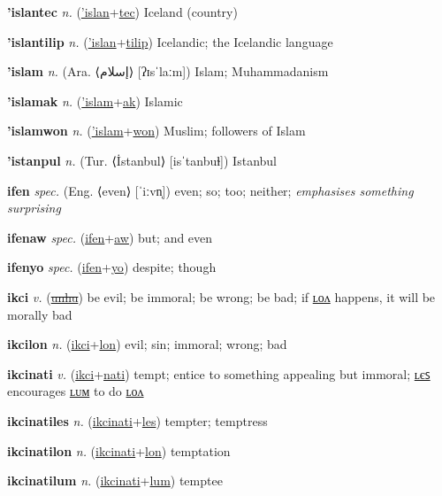 \textbf{\hypertarget{'islantec}{'islantec}} \textit{n.} (\hyperlink{'islan}{'islan}+\allowbreak \hyperlink{tec}{tec})
Iceland (country)

\textbf{\hypertarget{'islantilip}{'islantilip}} \textit{n.} (\hyperlink{'islan}{'islan}+\allowbreak \hyperlink{tilip}{tilip})
Icelandic; the Icelandic language

\textbf{\hypertarget{'islam}{'islam}} \textit{n.} (Ara. ⟨{\arabics{}إسلام}⟩ [ʔɪsˈlaːm])
Islam; Muhammadanism

\textbf{\hypertarget{'islamak}{'islamak}} \textit{n.} (\hyperlink{'islam}{'islam}+\allowbreak \hyperlink{ak}{ak})
Islamic

\textbf{\hypertarget{'islamwon}{'islamwon}} \textit{n.} (\hyperlink{'islam}{'islam}+\allowbreak \hyperlink{won}{won})
Muslim; followers of Islam

\textbf{\hypertarget{'istanpul}{'istanpul}} \textit{n.} (Tur. ⟨İstanbul⟩ [isˈtanbuɫ])
Istanbul

\textbf{\hypertarget{ifen}{ifen}} \textit{spec.} (Eng. ⟨even⟩ [ˈiːvn̩])
even; so; too; neither; \textit{emphasises something surprising}

\textbf{\hypertarget{ifenaw}{ifenaw}} \textit{spec.} (\hyperlink{ifen}{ifen}+\allowbreak \hyperlink{aw}{aw})
but; and even

\textbf{\hypertarget{ifenyo}{ifenyo}} \textit{spec.} (\hyperlink{ifen}{ifen}+\allowbreak \hyperlink{yo}{yo})
despite; though

\textbf{\hypertarget{ikci}{ikci}} \textit{v.} (\hyperlink{unhu}{\sout{unhu}})
be evil; be immoral; be wrong; be bad; if \hyperlink{ikcilon}{ʟᴏᴧ} happens, it will be morally bad

\textbf{\hypertarget{ikcilon}{ikcilon}} \textit{n.} (\hyperlink{ikci}{ikci}+\allowbreak \hyperlink{lon}{lon})
evil; sin; immoral; wrong; bad

\textbf{\hypertarget{ikcinati}{ikcinati}} \textit{v.} (\hyperlink{ikci}{ikci}+\allowbreak \hyperlink{nati}{nati})
tempt; entice to something appealing but immoral; \hyperlink{ikcinatiles}{ʟєꜱ} encourages \hyperlink{ikcinatilum}{ʟᴜᴍ} to do \hyperlink{ikcinatilon}{ʟᴏᴧ}

\textbf{\hypertarget{ikcinatiles}{ikcinatiles}} \textit{n.} (\hyperlink{ikcinati}{ikcinati}+\allowbreak \hyperlink{les}{les})
tempter; temptress

\textbf{\hypertarget{ikcinatilon}{ikcinatilon}} \textit{n.} (\hyperlink{ikcinati}{ikcinati}+\allowbreak \hyperlink{lon}{lon})
temptation

\textbf{\hypertarget{ikcinatilum}{ikcinatilum}} \textit{n.} (\hyperlink{ikcinati}{ikcinati}+\allowbreak \hyperlink{lum}{lum})
temptee

